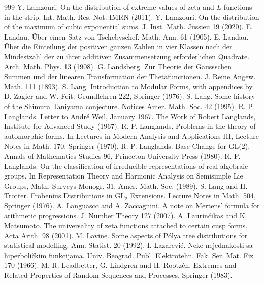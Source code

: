 \begin{thebibliography}{999}
 Y. Lamzouri. On the distribution of extreme values of zeta and $L$ functions in the strip. Int. Math. Res. Not. IMRN (2011).
 Y. Lamzouri. On the distribution of the maximum of cubic exponential sums. J. Inst. Math. Jussieu 19 (2020).
 E. Landau. \"Uber einen Satz von Tschebyschef. Math. Ann. 61 (1905).
 E. Landau. \"Uber die Einteilung der positiven ganzen Zahlen in vier Klassen nach der Mindestzahl der zu ihrer additiven Zusammensetzung erforderlichen Quadrate. Arch. Math. Phys. 13 (1908).
 G. Landsberg. Zur Theorie der Gaussschen Summen und der linearen Transformation der Thetafunctionen. J. Reine Angew. Math. 111 (1893).
 S. Lang. Introduction to Modular Forms, with appendices by D. Zagier and W. Feit. Grundlehren 222, Springer (1976).
 S. Lang. Some history of the Shimura Taniyama conjecture. Notices Amer. Math. Soc. 42 (1995).
 R. P. Langlands. Letter to Andr\'e Weil, January 1967. The Work of Robert Langlands, Institute for Advanced Study (1967).
 R. P. Langlands. Problems in the theory of automorphic forms. In Lectures in Modern Analysis and Applications III, Lecture Notes in Math. 170, Springer (1970).
 R. P. Langlands. Base Change for GL(2). Annals of Mathematics Studies 96, Princeton University Press (1980).
 R. P. Langlands. On the classification of irreducible representations of real algebraic groups. In Representation Theory and Harmonic Analysis on Semisimple Lie Groups, Math. Surveys Monogr. 31, Amer. Math. Soc. (1989).
 S. Lang and H. Trotter. Frobenius Distributions in $\mathrm{GL}_2$ Extensions. Lecture Notes in Math. 504, Springer (1976).
 A. Languasco and A. Zaccagnini. A note on Mertens' formula for arithmetic progressions. J. Number Theory 127 (2007).
 A. Laurin\v{c}ikas and K. Matsumoto. The universality of zeta functions attached to certain cusp forms. Acta Arith. 98 (2001).
 M. Lavine. Some aspects of P\'olya tree distributions for statistical modelling. Ann. Statist. 20 (1992).
 I. Lazarevi\'c. Neke nejednakosti sa hiperboli\v{c}kim funkcijama. Univ. Beograd. Publ. Elektrotehn. Fak. Ser. Mat. Fiz. 170 (1966).
 M. R. Leadbetter, G. Lindgren and H. Rootz\'en. Extremes and Related Properties of Random Sequences and Processes. Springer (1983).

\end{thebibliography}
